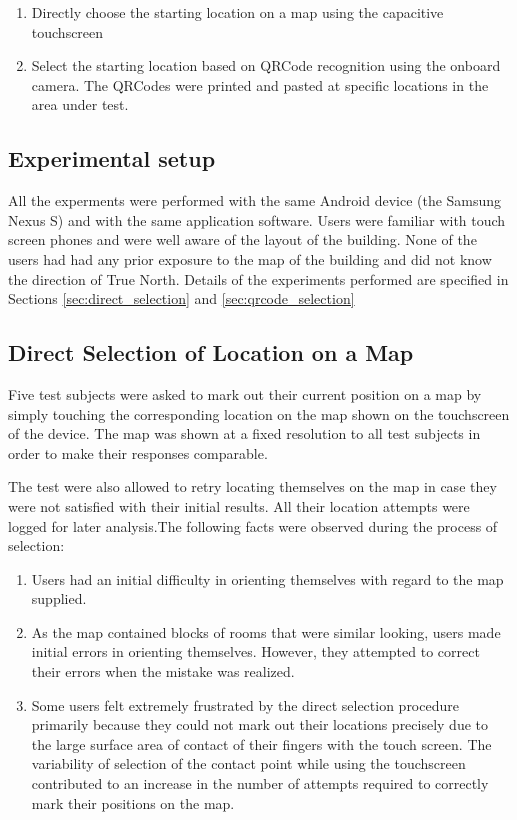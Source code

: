 \begin{enumerate}
\item Directly choose the starting location on a map using the capacitive 
    touchscreen
\item Select the starting location based on QRCode recognition using the onboard
    camera. The QRCodes were printed and pasted at specific locations 
    in the area under test.
\end{enumerate}


\subsection{Experimental setup}

All the experments were performed with the same Android device (the Samsung 
Nexus S) and with the same application software. Users were familiar with 
touch screen phones and were well aware of the layout of the building. None of
the users had had any prior exposure to the map of the building and did not 
know the direction of True North. Details of the experiments performed 
are specified in Sections \ref{sec:direct_selection} and \ref{sec:qrcode_selection}

\subsection{Direct Selection of Location on a Map\label{sec:direct_selection}}

Five test subjects were asked to mark out their current position on a
map by simply touching the corresponding location on the map shown on the 
touchscreen of the device. The map was shown at a fixed resolution to all 
test subjects in order to make their responses comparable. 

The test were also allowed to retry locating themselves on the map in case they
were not satisfied with their initial results. All their location attempts were
logged for later analysis.The following facts were observed during the process of 
selection:

\begin{enumerate}
\item Users had an initial difficulty in orienting themselves with regard to 
    the map supplied.
\item As the map contained blocks of rooms that were similar looking, users
    made initial errors in orienting themselves. However, they attempted to 
    correct their errors when the mistake was realized.
\item Some users felt extremely frustrated by the direct selection procedure
    primarily because they could not mark out their locations precisely due
    to the large surface area of contact of their fingers with the touch
    screen. The variability of selection of the contact point while using 
    the touchscreen contributed to an increase in the number of attempts
    required to correctly mark their positions on the map.
\end{enumerate}

